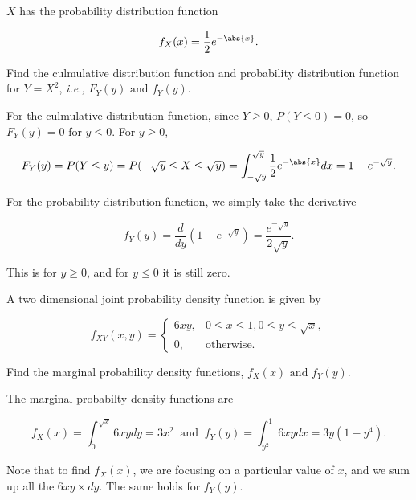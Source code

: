 \documentclass[english,a4paper,12pt]{report}
\begin{document}
{\(X\) has the probability distribution function

\begin{equation}
    f_{X}(x) = \frac{1}{2}e^{- \abs{x} }.
\end{equation}

Find the culmulative distribution function and probability distribution function for \(Y = X^2\), \textit{i.e.,} \(F_{Y}(y) \text { and } f_{Y}(y) \).  
}
{For the culmulative distribution function, since \(Y \ge 0\), \(P(Y \le 0) = 0\), so \(F_{Y}(y) = 0 \) for \(y \le 0\). For \(y \ge 0\),

\begin{equation}
    F_{Y}(y) = P(Y \le y) = P(-\sqrt{y} \le X \le \sqrt{y}  ) = \int_{-\sqrt{y} }^{\sqrt{y} } \frac{1}{2} e^{- \abs{x} }dx = 1-e^{-\sqrt{y} }. 
\end{equation}

For the probability distribution function, we simply take the derivative

\begin{equation}
    f_{Y}(y) = \frac{d}{dy} (1-e^{-\sqrt{y} } ) = \frac{e^{-\sqrt{y} } }{2\sqrt{y} }.  
\end{equation}

This is for \(y \ge 0\), and for \(y \le 0\) it is still zero.  
} 


{A two dimensional joint probability density function is given by 

\begin{equation}
    f_{XY}(x,y) = \begin{cases}
        6xy,& 0 \le x \le 1, 0 \le y \le \sqrt{x}, \\
        0,& \text{otherwise} .
    \end{cases}
\end{equation}

Find the marginal probability density functions, \(f_{X}(x) \text { and } f_{Y}(y)  \).
}
{The marginal probabilty density functions are 

\begin{equation}
    f_{X}(x) = \int_{0}^{\sqrt{x} } 6xy dy = 3x^2 ~\text { and }~ f_{Y}(y) = \int_{y^2}^{1} 6xy dx = 3y(1-y^4).      
\end{equation}

Note that to find \(f_{X}(x) \), we are focusing on a particular value of \(x\), and we sum up all the \(6xy \times dy\). The same holds for \(f_{Y}(y) \).    
} 
\end{document}
